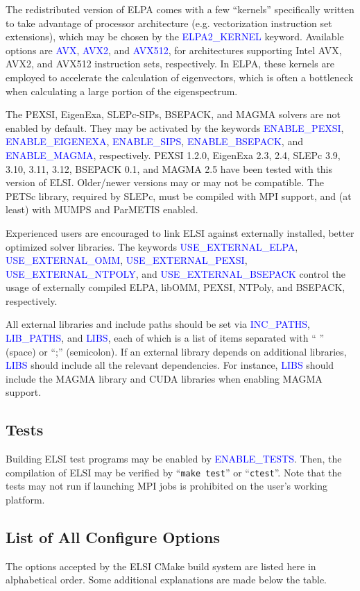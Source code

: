 \documentclass{report}
\newcommand{\tcb}[1]{\textcolor{blue}{#1}}
\begin{document}
The redistributed version of ELPA comes with a few ``kernels'' specifically written to take advantage of processor architecture (e.g. vectorization instruction set extensions), which may be chosen by the \tcb{ELPA2\_KERNEL} keyword. Available options are \tcb{AVX}, \tcb{AVX2}, and \tcb{AVX512}, for architectures supporting Intel AVX, AVX2, and AVX512 instruction sets, respectively. In ELPA, these kernels are employed to accelerate the calculation of eigenvectors, which is often a bottleneck when calculating a large portion of the eigenspectrum.

The PEXSI, EigenExa, SLEPc-SIPs, BSEPACK, and MAGMA solvers are not enabled by default. They may be activated by the keywords \tcb{ENABLE\_PEXSI}, \tcb{ENABLE\_EIGENEXA}, \tcb{ENABLE\_SIPS}, \tcb{ENABLE\_BSEPACK}, and \tcb{ENABLE\_MAGMA}, respectively. PEXSI 1.2.0, EigenExa 2.3, 2.4, SLEPc 3.9, 3.10, 3.11, 3.12, BSEPACK 0.1, and MAGMA 2.5 have been tested with this version of ELSI. Older/newer versions may or may not be compatible. The PETSc library, required by SLEPc, must be compiled with MPI support, and (at least) with MUMPS and ParMETIS enabled.

Experienced users are encouraged to link ELSI against externally installed, better optimized solver libraries. The keywords \tcb{USE\_EXTERNAL\_ELPA}, \tcb{USE\_EXTERNAL\_OMM}, \tcb{USE\_EXTERNAL\_PEXSI}, \tcb{USE\_EXTERNAL\_NTPOLY}, and \tcb{USE\_EXTERNAL\_BSEPACK} control the usage of externally compiled ELPA, libOMM, PEXSI, NTPoly, and BSEPACK, respectively.

All external libraries and include paths should be set via \tcb{INC\_PATHS}, \tcb{LIB\_PATHS}, and \tcb{LIBS}, each of which is a list of items separated with `` '' (space) or ``;'' (semicolon). If an external library depends on additional libraries, \tcb{LIBS} should include all the relevant dependencies. For instance, \tcb{LIBS} should include the MAGMA library and CUDA libraries when enabling MAGMA support.

\subsection{Tests}
\label{subsec:config_tests}
Building ELSI test programs may be enabled by \tcb{ENABLE\_TESTS}. Then, the compilation of ELSI may be verified by ``\verb+make test+'' or ``\verb+ctest+''. Note that the tests may not run if launching MPI jobs is prohibited on the user's working platform.

\subsection{List of All Configure Options}
\label{subsec:config_options}
The options accepted by the ELSI CMake build system are listed here in alphabetical order. Some additional explanations are made below the table.
\end{document}
